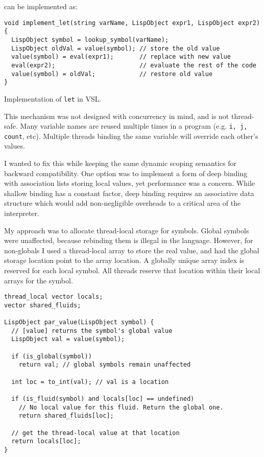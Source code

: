 can be implemented as:

\begin{code}
\begin{verbatim}
void implement_let(string varName, LispObject expr1, LispObject expr2) {
  LispObject symbol = lookup_symbol(varName);
  LispObject oldVal = value(symbol); // store the old value
  value(symbol) = eval(expr1);       // replace with new value
  eval(expr2);                       // evaluate the rest of the code
  value(symbol) = oldVal;            // restore old value
}
\end{verbatim}
\caption{Implementation of \texttt{let} in VSL.}
\label{code:let-vsl}
\end{code}

This mechanism was not designed with concurrency in mind, and is not thread-safe.
Many variable names are reused multiple times in a program (e.g. \texttt{i, j, count}, etc).
Multiple threads binding the same variable will override each other's values.

I wanted to fix this while keeping the same dynamic scoping semantics for backward compatibility.
One option was to implement a form of deep binding with association lists storing local values,
yet performance was a concern. While shallow binding has a constant factor, deep binding requires
an associative data structure which would add non-negligible overheads to a critical area of the
interpreter.

My approach was to allocate thread-local storage for symbols.
Global symbols were unaffected, because rebinding them is illegal in the language.
However, for non-globals I used a thread-local array to store the real value, and had the global storage
location point to the array location. A globally unique array index is reserved for each local symbol.
All threads reserve that location within their local arrays for the symbol.

\begin{verbatim}
thread_local vector locals;
vector shared_fluids;

LispObject par_value(LispObject symbol) {
  // [value] returns the symbol's global value
  LispObject val = value(symbol);

  if (is_global(symbol))
    return val; // global symbols remain unaffected

  int loc = to_int(val); // val is a location

  if (is_fluid(symbol) and locals[loc] == undefined)
    // No local value for this fluid. Return the global one.
    return shared_fluids[loc];

  // get the thread-local value at that location
  return locals[loc];
}
\end{verbatim}

